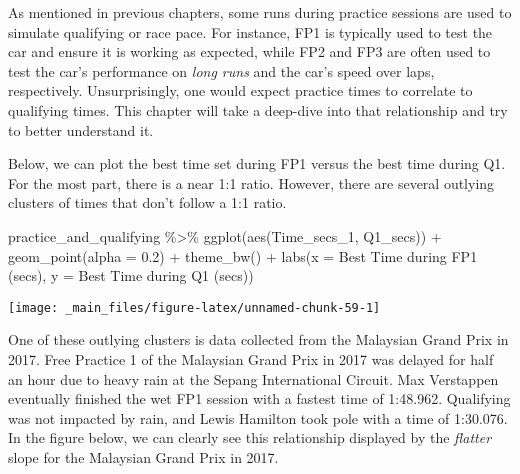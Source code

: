 \documentclass[
]{book}
\newenvironment{Shaded}{\begin{snugshade}}{\end{snugshade}}
\newcommand{\AttributeTok}[1]{\textcolor[rgb]{0.77,0.63,0.00}{#1}}
\newcommand{\FloatTok}[1]{\textcolor[rgb]{0.00,0.00,0.81}{#1}}
\newcommand{\FunctionTok}[1]{\textcolor[rgb]{0.00,0.00,0.00}{#1}}
\newcommand{\NormalTok}[1]{#1}
\newcommand{\SpecialCharTok}[1]{\textcolor[rgb]{0.00,0.00,0.00}{#1}}
\newcommand{\StringTok}[1]{\textcolor[rgb]{0.31,0.60,0.02}{#1}}
\begin{document}
As mentioned in previous chapters, some runs during practice sessions are used to simulate qualifying or race pace. For instance, FP1 is typically used to test the car and ensure it is working as expected, while FP2 and FP3 are often used to test the car's performance on \emph{long runs} and the car's speed over laps, respectively. Unsurprisingly, one would expect practice times to correlate to qualifying times. This chapter will take a deep-dive into that relationship and try to better understand it.

Below, we can plot the best time set during FP1 versus the best time during Q1. For the most part, there is a near 1:1 ratio. However, there are several outlying clusters of times that don't follow a 1:1 ratio.

\begin{Shaded}
\begin{Highlighting}[]
\NormalTok{practice\_and\_qualifying }\SpecialCharTok{\%\textgreater{}\%}
  \FunctionTok{ggplot}\NormalTok{(}\FunctionTok{aes}\NormalTok{(Time\_secs\_1, Q1\_secs)) }\SpecialCharTok{+}
  \FunctionTok{geom\_point}\NormalTok{(}\AttributeTok{alpha =} \FloatTok{0.2}\NormalTok{) }\SpecialCharTok{+}
  \FunctionTok{theme\_bw}\NormalTok{() }\SpecialCharTok{+}
  \FunctionTok{labs}\NormalTok{(}\AttributeTok{x =} \StringTok{\textquotesingle{}Best Time during FP1 (secs)\textquotesingle{}}\NormalTok{,}
       \AttributeTok{y =} \StringTok{\textquotesingle{}Best Time during Q1 (secs)\textquotesingle{}}\NormalTok{)}
\end{Highlighting}
\end{Shaded}

\begin{center}\texttt{[image: \_main\_files/figure-latex/unnamed-chunk-59-1]} \end{center}

One of these outlying clusters is data collected from the Malaysian Grand Prix in 2017. Free Practice 1 of the Malaysian Grand Prix in 2017 was delayed for half an hour due to heavy rain at the Sepang International Circuit. Max Verstappen eventually finished the wet FP1 session with a fastest time of 1:48.962. Qualifying was not impacted by rain, and Lewis Hamilton took pole with a time of 1:30.076. In the figure below, we can clearly see this relationship displayed by the \emph{flatter} slope for the Malaysian Grand Prix in 2017.
\end{document}

